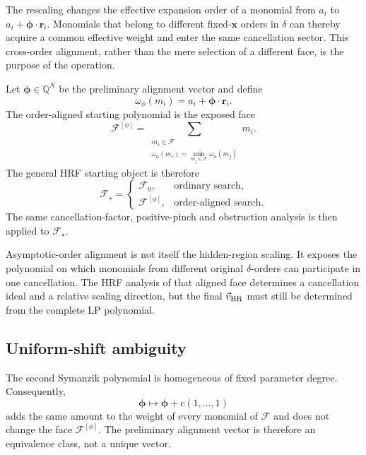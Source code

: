 \documentclass[a4paper,11pt]{article}
\newcommand{\x}{\boldsymbol{x}}
\newcommand{\vHR}{\vec v_{\rm HR}}
\begin{document}
The rescaling changes the effective expansion order of a monomial from
\(a_i\) to \(a_i+\boldsymbol\phi\cdot\boldsymbol r_i\).  Monomials that
belong to different fixed-\(\x\) orders in \(\delta\) can thereby acquire a
common effective weight and enter the same cancellation sector.  This
cross-order alignment, rather than the mere selection of a different face,
is the purpose of the operation.

Let \(\boldsymbol\phi\in\mathbb Q^N\) be the preliminary alignment vector and define
\begin{equation}
 \omega_{\phi}(m_i)
 =
 a_i+\boldsymbol\phi\cdot\boldsymbol r_i.
\end{equation}
The order-aligned starting polynomial is the exposed face
\begin{equation}
 \mathcal F^{[\phi]}
 =
 \sum_{\substack{m_i\in\mathcal F\\
                  \omega_\phi(m_i)=
                  \min_{m_j\in\mathcal F}\omega_\phi(m_j)}}m_i.
\label{eq:alignmentface}
\end{equation}
The general HRF starting object is therefore
\begin{equation}
 \mathcal F_\star=
 \begin{cases}
   \mathcal F_0, & \text{ordinary search},\\
   \mathcal F^{[\phi]}, & \text{order-aligned search}.
 \end{cases}
\label{eq:Fstar}
\end{equation}
The same cancellation-factor, positive-pinch and obstruction analysis is
then applied to \(\mathcal F_\star\).

Asymptotic-order alignment is not itself the hidden-region scaling.  It
exposes the polynomial on which monomials from different original
\(\delta\)-orders can participate in one cancellation.  The HRF analysis of
that aligned face determines a cancellation ideal and a relative scaling
direction, but the final \(\vHR\) must still be determined from the complete
LP polynomial.

\subsection{Uniform-shift ambiguity}

The second Symanzik polynomial is homogeneous of fixed parameter degree.
Consequently,
\begin{equation}
 \boldsymbol\phi\longmapsto
 \boldsymbol\phi+c(1,\ldots,1)
\label{eq:uniformshift}
\end{equation}
adds the same amount to the weight of every monomial of \(\mathcal F\) and
does not change the face \(\mathcal F^{[\phi]}\).  The preliminary alignment
vector is therefore an equivalence class, not a unique vector.
\end{document}
